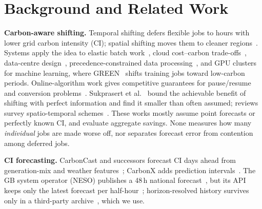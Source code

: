 \section{Background and Related Work}\label{sec:related}

\textbf{Carbon-aware shifting.}
Temporal shifting defers flexible jobs to hours with lower grid carbon intensity (CI);
spatial shifting moves them to cleaner regions~\cite{wiesner2021wait,radovanovic2023carbon}.
Systems apply the idea to elastic batch work~\cite{hanafy2023carbonscaler,souza2023ecovisor},
cloud cost--carbon trade-offs~\cite{hanafy2024gaia}, data-centre design~\cite{acun2023carbonexplorer},
precedence-constrained data processing~\cite{lechowicz2025pcaps}, and GPU clusters for machine
learning, where GREEN~\cite{xu2025green} shifts training jobs toward low-carbon periods.
Online-algorithm work gives competitive guarantees for pause/resume and conversion
problems~\cite{lechowicz2023pauseresume,lechowicz2024conversion}.
Sukprasert et al.~\cite{sukprasert2024limits} bound the achievable benefit of shifting with
perfect information and find it smaller than often assumed; reviews survey spatio-temporal
schemes~\cite{asadov2025review,riepin2025truly}. These works mostly assume point forecasts or
perfectly known CI, and evaluate aggregate savings. None measures how many \emph{individual} jobs are made
worse off, nor separates forecast error from contention among deferred jobs.

\textbf{CI forecasting.}
CarbonCast and successors forecast CI days ahead from generation-mix and weather
features~\cite{maji2022carboncast,maji2023multiday,maji2022dacf,yan2025ensembleci}; CarbonX adds
prediction intervals~\cite{maji2025carbonx}. The GB system operator (NESO) publishes a 48\,h national
forecast~\cite{ciapi,bruce2024cimethod}, but its API keeps only the latest forecast per
half-hour~\cite{ciapi_issue11}; horizon-resolved history survives only in a third-party
archive~\cite{powell_citracking}, which we use.

